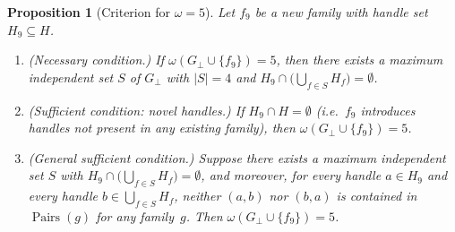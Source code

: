 \documentclass[10pt,a4paper]{amsart}
\newtheorem{proposition}{Proposition}
\DeclareMathOperator{\Pairs}{Pairs}
\begin{document}
\begin{proposition}[Criterion for $\omega = 5$]\label{prop:omega5}
Let $f_9$ be a new family with handle set $H_9 \subseteq H$.
\begin{enumerate}[nosep,label=(\alph*)]
\item\label{item:omega5-nec}
  \textup{(Necessary condition.)}
  If $\omega(G_\perp \cup \{f_9\}) = 5$, then there exists a
  maximum independent set $S$ of $G_\perp$ with $|S| = 4$ and
  $H_9 \cap \bigl(\bigcup_{f \in S} H_f\bigr) = \emptyset$.
\item\label{item:omega5-novel}
  \textup{(Sufficient condition: novel handles.)}
  If $H_9 \cap H = \emptyset$ (i.e.\ $f_9$ introduces handles not
  present in any existing family), then
  $\omega(G_\perp \cup \{f_9\}) = 5$.
\item\label{item:omega5-general}
  \textup{(General sufficient condition.)}
  Suppose there exists a maximum independent set $S$ with
  $H_9 \cap \bigl(\bigcup_{f \in S} H_f\bigr) = \emptyset$, and
  moreover, for every handle $a \in H_9$ and every handle
  $b \in \bigcup_{f \in S} H_f$, neither $(a, b)$ nor $(b, a)$
  is contained in $\Pairs(g)$ for any family~$g$.  Then
  $\omega(G_\perp \cup \{f_9\}) = 5$.
\end{enumerate}
\end{proposition}
\end{document}

